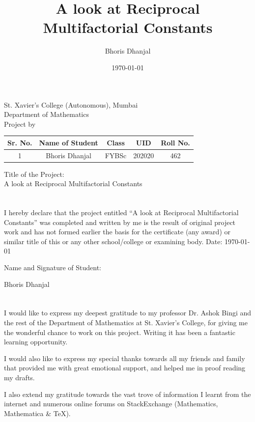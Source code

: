 \documentclass[12pt]{article}
\title{A look at Reciprocal\\ Multifactorial Constants}
\author{Bhoris Dhanjal}
\date{\today}
\makeatletter
\numberwithin{equation}{section}
\newcommand\frontmatter{%
    \cleardoublepage
  \pagenumbering{roman}}
\makeatother
\begin{document}

\frontmatter
\begin{center}
    \large St. Xavier’s College (Autonomous), Mumbai\\
\large Department of Mathematics\\
\large Project by\\
\begin{table}[h!]
\centering
\begin{tabular}{ccccc}
\hline
Sr. No. & Name of Student & Class & UID & Roll No. \\ \hline
1 & Bhoris Dhanjal & FYBSc & 202020 & 462 \\ \hline
\end{tabular}
\end{table}
Title of the Project:\\
A look at Reciprocal Multifactorial Constants
\end{center}
\clearpage

\section*{}
\par I hereby declare that the project entitled “A look at Reciprocal Multifactorial Constants” was completed and
written by me is the result of original project work and has not formed earlier the basis for
the certificate (any award) or similar title of this or any other school/college or examining
body.
\vfill
Date: \today \par
Name and Signature of Student:\\
\par Bhoris Dhanjal
\clearpage

\section*{}
I would like to express my deepest gratitude to my professor Dr. Ashok Bingi and the rest of the Department of Mathematics at St. Xavier's College, for giving me the wonderful chance to work on this project. Writing it has been a fantastic learning opportunity.
\par I would also like to express my special thanks towards all my friends and family that provided me with great emotional support, and helped me in proof reading my drafts.
\par I also extend my gratitude towards the vast trove of information I learnt from the internet and numerous online forums on StackExchange (Mathematics, Mathematica \& TeX).
\clearpage
\end{document}
